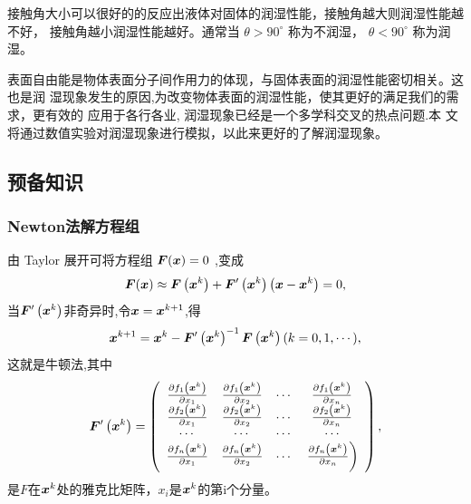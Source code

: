 \documentclass[12pt,oneside,a4paper]{article}
\begin{document}
接触角大小可以很好的的反应出液体对固体的润湿性能，接触角越大则润湿性能越不好，
接触角越小润湿性能越好。通常当 $\theta > 90^{\circ}$ 称为不润湿， $\theta <　90^{\circ}$
称为润湿。

表面自由能是物体表面分子间作用力的体现，与固体表面的润湿性能密切相关。这也是润
湿现象发生的原因,为改变物体表面的润湿性能，使其更好的满足我们的需求，更有效的
应用于各行各业, 润湿现象已经是一个多学科交叉的热点问题.本
文将通过数值实验对润湿现象进行模拟，以此来更好的了解润湿现象。

\subsection{预备知识}

\subsubsection{Newton法解方程组}
由 Taylor 展开可将方程组 ${\boldsymbol F}({\boldsymbol x})=0$ ,变成
\begin{equation*}
{\boldsymbol F}({\boldsymbol x}) \approx {\boldsymbol F}\left({\boldsymbol x}^{k}\right)+
{\boldsymbol F}'\left({\boldsymbol x}^{k}\right)\left({\boldsymbol x}-{\boldsymbol x}^{k}\right)=0,
\end{equation*}
当${\boldsymbol F}'\left({\boldsymbol x}^{k}\right)$非奇异时,令${\boldsymbol x} = {\boldsymbol x}^{k+1}$,得
\begin{equation*}
{\boldsymbol x}^{k+1}={\boldsymbol x}^{k}-{\boldsymbol F}^{\prime}\left({\boldsymbol x}^{k}\right)^{-1} {\boldsymbol F}\left({\boldsymbol x}^{k}\right)(k=0,1, \cdots),
\end{equation*}
这就是牛顿法,其中
\begin{equation*}
{\boldsymbol F}^{\prime}\left({\boldsymbol x}^{k}\right)=\left(\begin{array}{cccc}
\frac{\partial f_{1}\left({\boldsymbol x}^{k}\right)}{\partial x_{1}} &
\frac{\partial f_{1}\left({\boldsymbol x}^{k}\right)}{\partial x_{2}} &
\cdots & \frac{\partial f_{1}\left({\boldsymbol x}^{k}\right)}{\partial x_{n}} \\
\frac{\partial f_{2}\left({\boldsymbol x}^{k}\right)}{\partial x_{1}} &
\frac{\partial f_{2}\left({\boldsymbol x}^{k}\right)}{\partial x_{2}} &
\cdots & \frac{\partial f_{2}\left({\boldsymbol x}^{k}\right)}{\partial x_{n}} \\
\cdots & \cdots & \cdots & \cdots \\
\frac{\partial f_{n}\left({\boldsymbol x}^{k}\right)}{\partial x_{1}} &
\frac{\partial f_{n}\left({\boldsymbol x}^{k}\right)}{\partial x_{2}} &
\cdots & \left.\frac{\partial f_{n}\left({\boldsymbol x}^{k}\right)}{\partial x_{n}}\right)
\end{array}\right),
\end{equation*}
是$F$在${\boldsymbol x}^k$处的雅克比矩阵，$x_i$是${\boldsymbol x}^k$的第i个分量。
\end{document}
